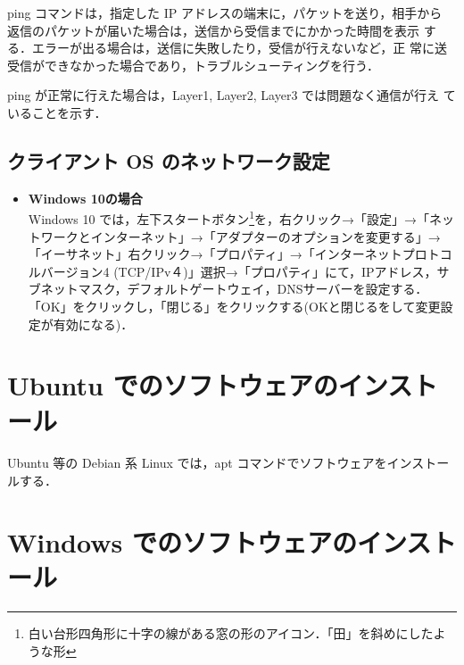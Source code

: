 ping コマンドは，指定した IP アドレスの端末に，パケットを送り，相手から
     返信のパケットが届いた場合は，送信から受信までにかかった時間を表示
     する．エラーが出る場合は，送信に失敗したり，受信が行えないなど，正
     常に送受信ができなかった場合であり，トラブルシューティングを行う．

ping が正常に行えた場合は，Layer1, Layer2, Layer3 では問題なく通信が行え
     ていることを示す．


\subsection*{クライアント OS のネットワーク設定}

\begin{itemize}
\item{\bf Windows 10の場合}\\
Windows 10 では，左下スタートボタン\footnote{白い台形四角形に十字の線がある窓の形のアイコン．「田」を斜めにしたような形}を，右クリック→「設定」→「ネットワークとインターネット」→「アダプターのオプションを変更する」→「イーサネット」右クリック→「プロパティ」→「インターネットプロトコルバージョン4 (TCP/IPv４)」選択→「プロパティ」にて，IPアドレス，サブネットマスク，デフォルトゲートウェイ，DNSサーバーを設定する．\\
 「OK」をクリックし，「閉じる」をクリックする(OKと閉じるをして変更設定が有効になる)．
\end{itemize}

\section{Ubuntu でのソフトウェアのインストール}

Ubuntu 等の Debian 系 Linux では，apt コマンドでソフトウェアをインストールする．


\section{Windows でのソフトウェアのインストール}


